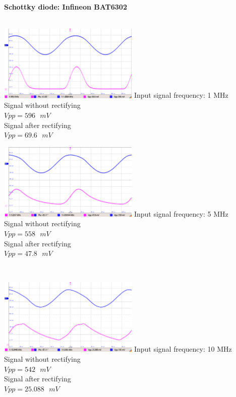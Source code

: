 \documentclass[12pt,a4paper,bold]{thesis}
\theoremstyle{thm}
\theoremstyle{definition}
\begin{document}
\\\\
\textbf{Schottky diode: Infineon BAT6302}\\\\
\begin{minipage}[b]{0.48\linewidth}
\includegraphics[width=6.7cm]{Images/Infinion/RF1MHz.png}  
Input signal frequency: 1 MHz\\
Signal without rectifying\\
$Vpp = 596\text{ }mV$\\
Signal after rectifying\\
$Vpp = 69.6\text{ }mV$\\
\end{minipage}
\hfill
\begin{minipage}[b]{0.48\linewidth}
\includegraphics[width=6.7cm]{Images/Infinion/RF5MHz.png}  
Input signal frequency: 5 MHz\\
Signal without rectifying\\
$Vpp = 558\text{ }mV$\\
Signal after rectifying\\
$Vpp = 47.8\text{ }mV$\\
\end{minipage}
\\
\begin{minipage}[b]{0.48\linewidth}
\includegraphics[width=6.7cm]{Images/Infinion/RF10MHz.png}  
Input signal frequency: 10 MHz\\
Signal without rectifying\\
$Vpp = 542\text{ }mV$\\
Signal after rectifying\\
$Vpp = 25.088\text{ }mV$\\
\end{minipage}
\end{document}
